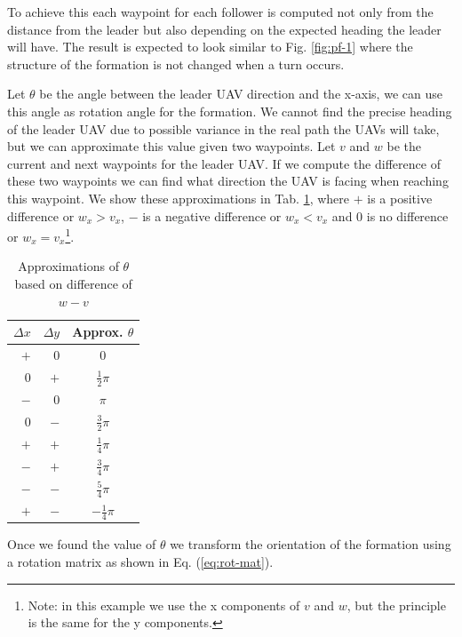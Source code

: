To achieve this each waypoint for each follower is computed not only from the distance 
from the leader but also depending on the expected heading the leader will have. The 
result is expected to look similar to Fig. \ref{fig:pf-1} where the structure of
the formation is not changed when a turn occurs. 

Let $\theta$ be the angle between
the leader UAV direction and the x-axis, we can use this angle as rotation angle for 
the formation. We cannot find the precise heading of the leader UAV due to possible
variance in the real path the UAVs will take, but we can approximate this value given
two waypoints. Let $v$ and $w$ be the current and next waypoints for the leader UAV. 
If we compute the difference of these two waypoints we can find what direction the 
UAV is facing when reaching this waypoint. We show these approximations in Tab. \ref{tab:approx},
where $+$ is a positive difference or $w_x > v_x$, $-$ is a negative difference or $w_x < v_x$
and $0$ is no difference or $w_x = v_x$\footnote{Note: in this example we use the x components of $v$ and $w$, 
but the principle is the same for the y components.}.

\begin{table}
	\caption{Approximations of $\theta$ based on difference of $w - v$}\label{tab:approx}
	\begin{center}
		\begin{tabular}[c]{r|r|c}
			\hline
			\multicolumn{1}{c|}{\textbf{$\Delta x$}} & 
			\multicolumn{1}{c|}{\textbf{$\Delta y$}} &
			\multicolumn{1}{c}{Approx. \textbf{$\theta$}} \\
			\hline
			\hline
			$+$ & $0$ & $0$ \\
			\hline
			$0$ & $+$ & $\frac{1}{2}\pi$ \\
			\hline
			$-$ & $0$ & $\pi$ \\
			\hline
			$0$ & $-$ & $\frac{3}{2}\pi$ \\
			\hline
			$+$ & $+$ & $\frac{1}{4}\pi$ \\
			\hline
			$-$ & $+$ & $\frac{3}{4}\pi$ \\
			\hline
			$-$ & $-$ & $\frac{5}{4}\pi$ \\
			\hline
			$+$ & $-$ & $-\frac{1}{4}\pi$ \\
			\hline
		\end{tabular}
	\end{center}
\end{table}

Once we found the value of $\theta$ we transform the orientation of the formation using a rotation matrix
as shown in Eq. (\ref{eq:rot-mat}).

